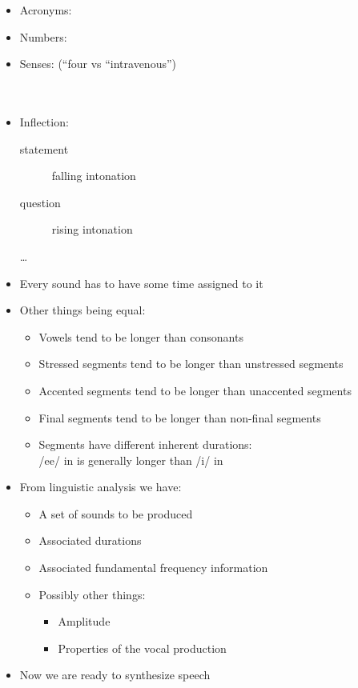\documentclass[a4paper,landscape,headrule,footrule,xetex]{foils}
\begin{document}
\begin{itemize}
\item Acronyms: 
\item Numbers: 
\item Senses:  (``four vs ``intravenous'')
  \\ 
\\ 
\\ 
\item Inflection:
  \begin{description}
  \item[statement] falling intonation
  \item[question] rising intonation
  \item[{\ldots}]
  \end{description}
\end{itemize}

\begin{itemize}
\item Every sound has to have some time assigned to it
\item Other things being equal:
  \begin{itemize}
  \item Vowels tend to be longer than consonants
  \item Stressed segments tend to be longer than unstressed segments
  \item Accented segments tend to be longer than unaccented segments
  \item Final segments tend to be longer than non-final segments
  \item Segments have different inherent durations: 
    \\ /ee/ in  is generally longer than /i/ in 
    \end{itemize}
  \end{itemize}
  \begin{itemize}
  \item From linguistic analysis we have:
    \begin{itemize}
    \item A set of sounds to be produced
    \item   Associated durations
    \item   Associated fundamental frequency information
    \item   Possibly other things:
          \begin{itemize}
            \item Amplitude
           \item  Properties of the vocal production
          \end{itemize}
        \end{itemize}
      \item Now we are ready to synthesize speech
  \end{itemize}
\end{document}

